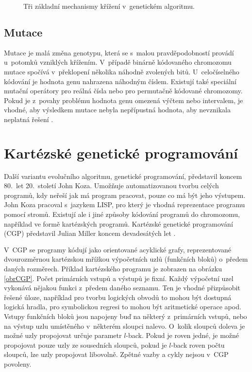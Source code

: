 \begin{figure}[htb]
    \centering
    \caption{Tři základní mechanismy křížení v~genetickém algoritmu.}
    \label{obrKrizeni}
\end{figure}


\subsection{Mutace}

Mutace je malá změna genotypu, která se s~malou pravděpodobností provádí u~potomků vzniklých křížením. V~případě binárně kódovaného chromozomu mutace spočívá v~překlopení několika náhodně zvolených bitů. U~celočíselného kódování je hodnota genu nahrazena náhodným číslem. Existují také speciální mutační operátory pro reálná čísla nebo pro permutačně kódované chromozomy. Pokud je z~povahy problému hodnota genu omezená výčtem nebo intervalem, je vhodné, aby výsledkem mutace nebyla nepřípustná hodnota, aby nevznikala neplatná řešení \cite{Modra}.

\section{Kartézské genetické programování}
\label{secCGP}

Další variantu evolučního algoritmu, genetické programování, představil koncem 80.~let 20.~století John Koza. Umožňuje automatizovanou tvorbu celých programů, kdy neřeší jak má program pracovat, pouze co má být jeho výstupem. John Koza pracoval s~jazykem LISP, pro který je vhodná reprezentace programu pomocí stromů. Existují ale i jiné způsoby kódování programů do chromozomu, například ve formě kartézských programů. Kartézské genetické programování (CGP) představil Julian Miller koncem devadesátých let \cite{Miller2000}.

V~CGP se programy kódují jako orientované acyklické grafy, reprezentované dvourozměrnou kartézskou mřížkou výpočetních uzlů (funkčních bloků) o~předem daných rozměrech. Příklad kartézského programu je zobrazen na obrázku \ref{obrCGP}. Počet primárních vstupů a výstupů je fixní. Každý výpočetní uzel vykonává nějakou funkci z~předem daného seznamu. Ten je vhodné přizpůsobit řešené úloze, například pro tvorbu logických obvodů to mohou být dostupná logická hradla, pro symbolickou regresi to mohou být aritmetické operace apod. Vstupy funkčních bloků jsou napojeny buď na některý z~primárních vstupů, nebo na výstup uzlu umístěného v~některém sloupci nalevo. O~kolik sloupců doleva je možné uzly propojovat určuje parametr $l$-back. Pokud je roven jedné, je možné propojovat pouze uzly ze sousedních sloupců, pokud je $l$-back roven počtu sloupců, lze uzly propojovat libovolně. Zpětné vazby a cykly nejsou v~CGP povoleny.

